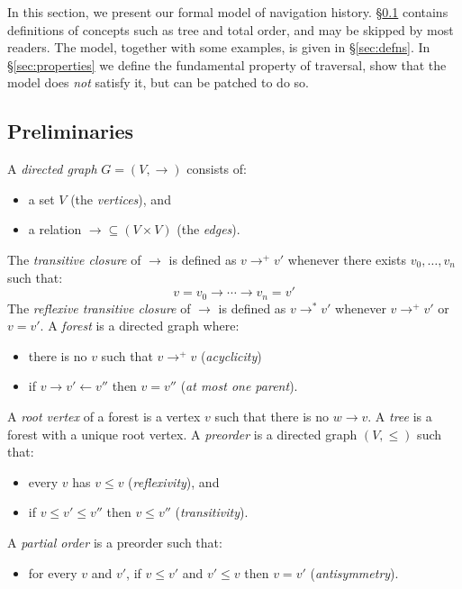 \documentclass{notes}
\newcommand{\Verts}{V}
\newcommand{\aVert}{v}
\newcommand{\bVert}{w}
\newcommand{\parentOf}{\rightarrow}
\newcommand{\childOf}{\leftarrow}
\begin{document}
In this section, we present our formal model of navigation history.
\S\ref{sec:preliminaries} contains definitions of concepts such as
tree and total order, and may be skipped by most readers. The model,
together with some examples, is given in \S\ref{sec:defns}. In
\S\ref{sec:properties} we define the fundamental property of
traversal, show that the model does \emph{not} satisfy
it, but can be patched to do so.

\subsection{Preliminaries}
\label{sec:preliminaries}

A \emph{directed graph} $G=(\Verts,{\parentOf})$ consists of:
\begin{itemize}
\item a set $\Verts$ (the \emph{vertices}), and
\item a relation ${\parentOf} \subseteq (\Verts\times\Verts)$ (the \emph{edges}).
\end{itemize}
The \emph{transitive closure} of $\parentOf$ is defined as $\aVert\parentOf^+\aVert'$ whenever
there exists $\aVert_0,\ldots,\aVert_n$ such that:
\[
  \aVert=\aVert_0\parentOf\cdots\parentOf\aVert_n=\aVert'
\]
The \emph{reflexive transitive closure} of $\parentOf$ is defined as $\aVert\parentOf^*\aVert'$ whenever
$\aVert\parentOf^+\aVert'$ or $\aVert=\aVert'$.
A \emph{forest} is a directed graph where:
\begin{itemize}
\item there is no $\aVert$ such that $\aVert\parentOf^+\aVert$ (\emph{acyclicity})
\item if $\aVert\parentOf\aVert'\childOf\aVert''$ then $\aVert=\aVert''$ (\emph{at most one parent}).
\end{itemize}
A \emph{root vertex} of a forest is a vertex $\aVert$ such that there is no $\bVert\parentOf\aVert$.
A \emph{tree} is a forest with a unique root vertex.
A \emph{preorder} is a directed graph $(\Verts, {\le})$ such that:
\begin{itemize}
\item every $\aVert$ has $\aVert\le\aVert$ (\emph{reflexivity}), and
\item if $\aVert\le\aVert'\le\aVert''$ then $\aVert\le\aVert''$ (\emph{transitivity}).
\end{itemize}
A \emph{partial order} is a preorder such that:
\begin{itemize}
\item for every $\aVert$ and $\aVert'$, if $\aVert\le\aVert'$ and $\aVert'\le\aVert$ then $\aVert=\aVert'$
  (\emph{antisymmetry}).
\end{itemize}
\end{document}

